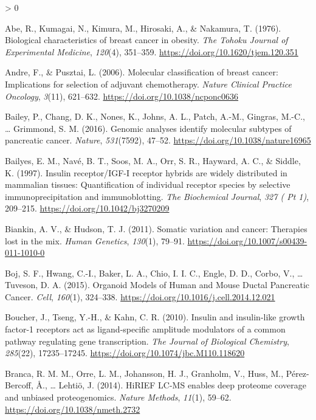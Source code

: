 \documentclass[
  12pt,
  openany]{book}
\newlength{\cslhangindent}
\newenvironment{CSLReferences}[2] %
 {%
  \setlength{\parindent}{0pt}
  \ifodd #1 \everypar{\setlength{\hangindent}{\cslhangindent}}\ignorespaces\fi
  \ifnum #2 > 0
  \setlength{\parskip}{#2\baselineskip}
  \fi
 }%
 {}
\begin{document}
\hypertarget{refs}{}
\begin{CSLReferences}{1}{0}
\leavevmode\hypertarget{ref-Abe1976}{}%
Abe, R., Kumagai, N., Kimura, M., Hirosaki, A., \& Nakamura, T. (1976). Biological characteristics of breast cancer in obesity. \emph{The Tohoku Journal of Experimental Medicine}, \emph{120}(4), 351--359. \url{https://doi.org/10.1620/tjem.120.351}

\leavevmode\hypertarget{ref-Andre2006}{}%
Andre, F., \& Pusztai, L. (2006). Molecular classification of breast cancer: Implications for selection of adjuvant chemotherapy. \emph{Nature Clinical Practice Oncology}, \emph{3}(11), 621--632. \url{https://doi.org/10.1038/ncponc0636}

\leavevmode\hypertarget{ref-Bailey2016}{}%
Bailey, P., Chang, D. K., Nones, K., Johns, A. L., Patch, A.-M., Gingras, M.-C., \ldots{} Grimmond, S. M. (2016). Genomic analyses identify molecular subtypes of pancreatic cancer. \emph{Nature}, \emph{531}(7592), 47--52. \url{https://doi.org/10.1038/nature16965}

\leavevmode\hypertarget{ref-Bailyes1997b}{}%
Bailyes, E. M., Navé, B. T., Soos, M. A., Orr, S. R., Hayward, A. C., \& Siddle, K. (1997). Insulin receptor/{IGF}-{I} receptor hybrids are widely distributed in mammalian tissues: Quantification of individual receptor species by selective immunoprecipitation and immunoblotting. \emph{The Biochemical Journal}, \emph{327 ( Pt 1)}, 209--215. \url{https://doi.org/10.1042/bj3270209}

\leavevmode\hypertarget{ref-Biankin2011}{}%
Biankin, A. V., \& Hudson, T. J. (2011). Somatic variation and cancer: Therapies lost in the mix. \emph{Human Genetics}, \emph{130}(1), 79--91. \url{https://doi.org/10.1007/s00439-011-1010-0}

\leavevmode\hypertarget{ref-Boj2015}{}%
Boj, S. F., Hwang, C.-I., Baker, L. A., Chio, I. I. C., Engle, D. D., Corbo, V., \ldots{} Tuveson, D. A. (2015). Organoid {Models} of {Human} and {Mouse Ductal Pancreatic Cancer}. \emph{Cell}, \emph{160}(1), 324--338. \url{https://doi.org/10.1016/j.cell.2014.12.021}

\leavevmode\hypertarget{ref-Boucher2010}{}%
Boucher, J., Tseng, Y.-H., \& Kahn, C. R. (2010). Insulin and insulin-like growth factor-1 receptors act as ligand-specific amplitude modulators of a common pathway regulating gene transcription. \emph{The Journal of Biological Chemistry}, \emph{285}(22), 17235--17245. \url{https://doi.org/10.1074/jbc.M110.118620}

\leavevmode\hypertarget{ref-Branca2014}{}%
Branca, R. M. M., Orre, L. M., Johansson, H. J., Granholm, V., Huss, M., Pérez-Bercoff, Å., \ldots{} Lehtiö, J. (2014). {HiRIEF LC}-{MS} enables deep proteome coverage and unbiased proteogenomics. \emph{Nature Methods}, \emph{11}(1), 59--62. \url{https://doi.org/10.1038/nmeth.2732}


\end{CSLReferences}
\end{document}
